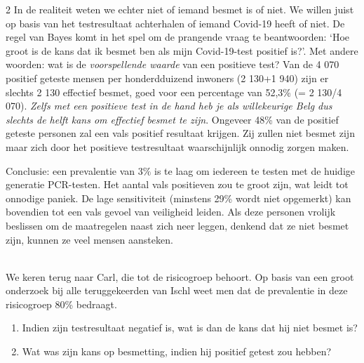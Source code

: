 \begin{multicols}{2}
In de realiteit weten we echter niet of iemand besmet is of niet. We willen juist op basis van het testresultaat achterhalen of iemand Covid-19 heeft of niet. De regel van Bayes komt in het spel om de prangende vraag te beantwoorden: `Hoe groot is de kans dat ik besmet ben als mijn Covid-19-test positief is?'. Met andere woorden: wat is de \textit{voorspellende waarde} van een positieve test? Van de 4 070 positief geteste mensen per honderdduizend inwoners (2 130+1 940) zijn er slechts 2 130 effectief besmet, goed voor een percentage van 52,3\% (= 2 130/4 070). \textit{Zelfs met een positieve test in de hand heb je als willekeurige Belg dus slechts de helft kans om effectief besmet te zijn}. Ongeveer 48\% van de positief geteste personen zal een vals positief resultaat krijgen. Zij zullen niet besmet zijn maar zich door het positieve testresultaat waarschijnlijk onnodig zorgen maken.

Conclusie: een prevalentie van 3$\%$ is te laag om iedereen te testen met de huidige generatie PCR-testen. Het aantal vals positieven zou te groot zijn, wat leidt tot onnodige paniek. De lage sensitiviteit (minstens 29\% wordt niet opgemerkt) kan bovendien tot een vals gevoel van veiligheid leiden. Als deze personen vrolijk beslissen om de maatregelen naast zich neer leggen, denkend dat ze niet besmet zijn, kunnen ze veel mensen aansteken.
\end{multicols}

\ \\
\noindent We keren terug naar Carl, die tot de risicogroep behoort. Op basis van een groot onderzoek bij alle teruggekeerden van Ischl weet men dat de prevalentie in deze risicogroep 80\% bedraagt. 
\begin{enumerate}
	\item[a.] Indien zijn testresultaat negatief is, wat is dan de kans dat hij niet besmet is? 
	\item[b.]	Wat was zijn kans op besmetting, indien hij positief getest zou hebben?
\end{enumerate}



